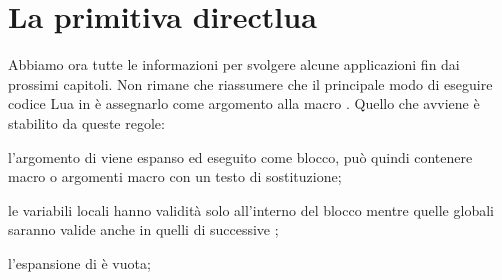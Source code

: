 \section{La primitiva directlua}

Abbiamo ora tutte le informazioni per svolgere alcune applicazioni fin dai
prossimi capitoli. Non rimane che riassumere che il principale modo di eseguire
codice Lua in \LuaTeX{} è assegnarlo come argomento alla macro .
Quello che avviene è stabilito da queste regole:
\begin{compactenumerate}
\item l'argomento di  viene espanso ed eseguito come blocco, può
quindi contenere macro o argomenti macro con un testo di sostituzione;

\item le variabili locali hanno validità solo all'interno del blocco mentre
quelle globali saranno valide anche in quelli di successive ;

\item l'espansione di  è vuota;
\end{compactenumerate}


